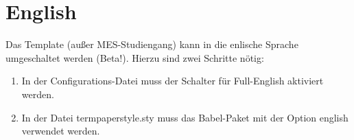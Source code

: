 %
\section{English}\label{sec:english}
Das Template (außer MES-Studiengang) kann in die enlische Sprache umgeschaltet werden (Beta!). Hierzu sind zwei Schritte nötig:

\begin{enumerate}
\item In der Configurations-Datei muss der Schalter für Full-English aktiviert werden.
\item In der Datei termpaperstyle.sty muss das Babel-Paket mit der Option english verwendet werden.
\end{enumerate}

